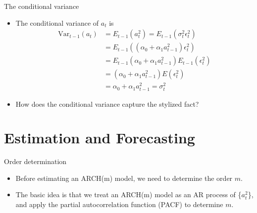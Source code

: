 \documentclass[presentation,10pt]{beamer}
\newcommand{\var}{\mathrm{Var}}
\begin{document}
\begin{frame}[label={sec:org1246b88}]{The conditional variance}
\begin{itemize}
\item The conditional variance of \(a_t\) is 
\begin{equation*}
\begin{split}
\var_{t-1}(a_t) &= E_{t-1}(a^2_t) = E_{t-1} \left( \sigma^2_t \epsilon_t^2 \right) \\
&= E_{t-1}\left((\alpha_0 + \alpha_1 a^2_{t-1}) \epsilon^2_t \right) \\ 
&= E_{t-1}(\alpha_0 + \alpha_1 a^2_{t-1}) E_{t-1}(\epsilon^2_t) \\
&= (\alpha_0 + \alpha_1 a^2_{t-1}) E(\epsilon^2_t) \\
&= \alpha_0 + \alpha_1 a^2_{t-1} = \sigma^2_t
\end{split}
\end{equation*}

\item How does the conditional variance capture the stylized fact?
\end{itemize}
\end{frame}

\section{Estimation and Forecasting}
\label{sec:org499dc0e}

\begin{frame}[label={sec:orga538a75}]{Order determination}
\begin{itemize}
\item Before estimating an ARCH(m) model, we need to determine the order
\(m\).

\vspace{0.2cm}

\item The basic idea is that we treat an ARCH(m) model as an AR process
of \{\(a^2_t\)\}, and apply the partial autocorrelation function (PACF) to
determine \(m\).
\end{itemize}
\end{frame}
\end{document}
